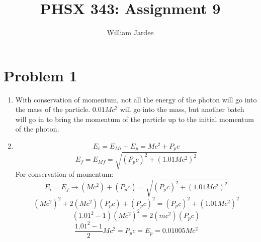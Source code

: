 \documentclass[11pt]{article}
\begin{document}
\date{}

\title{PHSX 343: Assignment 9}

\author{William Jardee}

\maketitle


\section*{Problem 1}
    \begin{enumerate}[label=\alph*)]
        \item 
            With conservation of momentum, not all the energy of the photon will go into the mass of the particle. $0.01Mc^2$ will go into the mass, but another batch will go in to bring the momentum of the particle up to the initial momentum of the photon. 
        \item
            \[E_i = E_{Mi} + E_p = Mc^2 + P_p c\]
            \[E_f = E_{Mf} = \sqrt{(P_pc)^2 + (1.01Mc^2)^2}\]
            For conservation of momentum:
            \[E_i = E_f \rightarrow (Mc^2) + (P_p c) = \sqrt{(P_p c)^2 + (1.01Mc^2)^2}\]
            \[(Mc^2)^2 + 2(Mc^2)(P_p c) + (P_p c)^2 = (P_p c)^2 + (1.01 Mc^2)^2\]
            \[(1.01^2 -1)(Mc^2)^2 = 2 (mc^2)(P_p c)\]
            \[\frac{1.01^2 -1}{2}Mc^2 = P_p c = E_p = 0.01005 Mc^2\]
        
    \end{enumerate}
\end{document}
